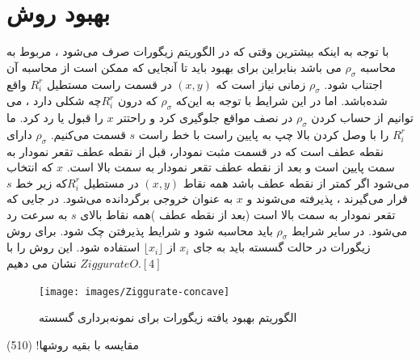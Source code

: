    \section{بهبود روش }   
با توجه به اینکه بیشترین وقتی که در الگوریتم زیگورات صرف می‌شود ، مربوط به محاسبه $\rho _{\sigma}$ می باشد بنابراین برای بهبود باید تا آنجایی که ممکن است از محاسبه آن اجتناب شود. $\rho _{\sigma}$ زمانی نیاز است که $(x,y)$ در قسمت راست مستطیل $R^{r} _{i}$ واقع شده‌باشد. اما در این شرایط با توجه به این‌که $\rho _{\sigma}$  که درون $R^{r} _{i}$چه شکلی دارد ، می توانیم از حساب کردن $\rho _{\sigma}$ در نصف مواقع جلوگیری کرد و راحتتر $x$ را قبول یا رد کرد.
ما $R^{r} _{i}$ را با وصل کردن بالا چپ به پایین راست با خط راست $s$ قسمت می‌کنیم. $\rho _{\sigma}$   دارای نقطه عطف است که در قسمت مثبت نمودار، قبل از نقطه عطف تقعر نمودار به سمت پایین است و بعد از نقطه عطف تقعر نمودار به سمت بالا است.   $x$ که انتخاب می‌شود اگر کمتر از نقطه عطف باشد همه نقاط $(x,y)$ در مستطیل $R^{r} _{i}$که زیر خط $s$ قرار می‌گیرند ، پذیرفته می‌شوند و $x$ به عنوان خروجی برگردانده می‌شود. در جایی که تقعر نمودار به سمت بالا است (بعد از نقطه عطف )همه نقاط بالای $s$ به سرعت رد می‌شود. در سایر شرایط $\rho _{\sigma}$ باید محاسبه شود و شرایط پذیرفتن چک شود. برای روش زیگورات در حالت گسسته باید به جای $x_{i}$ از $\lfloor x_{i}\rfloor $ استفاده شود. این روش را با $ZiggurateO$  نشان می دهیم.$[4]$
    \begin{figure}[!htb]
      	\texttt{[image: images/Ziggurate-concave]}
      	\caption{الگوریتم  بهبود یافته زیگورات برای نمونه‌برداری گسسته}\label{fig:logtonemap}
      	\endminipage\hfill

      \end{figure}
      
مقایسه با بقیه روشها! (510)

